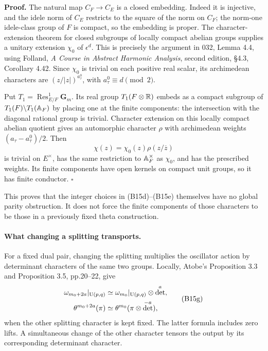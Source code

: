 \documentclass[11pt]{article}
\theoremstyle{definition}\newtheorem{definition}[theorem]{Definition}\newtheorem{remark}[theorem]{Remark}
\begin{document}
\textbf{Proof.}
The natural map $C_F\to C_E$ is a closed embedding. Indeed it is injective, and the idele norm of $C_E$ restricts to the square of the norm on $C_F$; the norm-one idele-class group of $F$ is compact, so the embedding is proper. The character-extension theorem for closed subgroups of locally compact abelian groups supplies a unitary extension $\chi_0$ of $\epsilon^d$. This is precisely the argument in 032, Lemma 4.4, using Folland, \emph{A Course in Abstract Harmonic Analysis}, second edition, \S4.3, Corollary 4.42. Since $\chi_0$ is trivial on each positive real scalar, its archimedean characters are $(z/|z|)^{a^0_\tau}$, with $a^0_\tau\equiv d\pmod2$.

Put $T_1=\operatorname{Res}^{1}_{E/F}\mathbf G_m$. Its real group $T_1(F\otimes\mathbb R)$ embeds as a compact subgroup of $T_1(F)\backslash T_1(\mathbb A_F)$ by placing one at the finite components: the intersection with the diagonal rational group is trivial. Character extension on this locally compact abelian quotient gives an automorphic character $\rho$ with archimedean weights $(a_\tau-a^0_\tau)/2$. Then
\[
 \chi(z)=\chi_0(z)\rho(z/\overline z)
\]
is trivial on $E^\times$, has the same restriction to $\mathbb A_F^\times$ as $\chi_0$, and has the prescribed weights. Its finite components have open kernels on compact unit groups, so it has finite conductor. \hfill$\square$

This proves that the integer choices in (B15d)--(B15e) themselves have no global parity obstruction. It does not force the finite components of those characters to be those in a previously fixed theta construction.

\paragraph{What changing a splitting transports.}
For a fixed dual pair, changing the splitting multiplies the oscillator action by determinant characters of the same two groups. Locally, Atobe's Proposition 3.3 and Proposition 3.5, pp.20--22, give
\begin{equation}
\begin{aligned}
 \omega_{m_0+2a}|_{\operatorname{U}(p,q)}
       &\simeq\omega_{m_0}|_{\operatorname{U}(p,q)}\otimes\det^a,\\
 \theta^{m_0+2a}(\pi)
       &\simeq\theta^{m_0}(\pi\otimes\det^{-a}),
\end{aligned}
 \tag{B15g}
\end{equation}
when the other splitting character is kept fixed. The latter formula includes zero lifts. A simultaneous change of the other character tensors the output by its corresponding determinant character.
\end{document}
